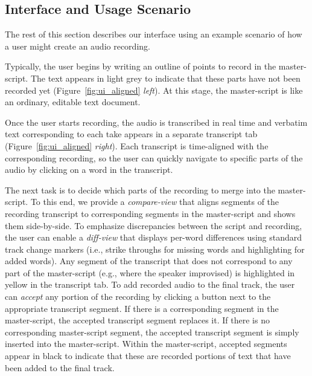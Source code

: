 
\subsection{Interface and Usage Scenario}
The rest of this section describes our interface using an example scenario of how a user might create an audio recording. 

Typically, the user begins by writing an outline of points to record in the master-script.
The text appears in light grey to indicate that these parts have not been recorded yet (Figure~\ref{fig:ui_aligned} \textit{left}). At this stage, the master-script is like an ordinary, editable text document. 

Once the user starts recording, the audio is transcribed in real time and verbatim text corresponding to each take appears in a separate transcript tab (Figure~\ref{fig:ui_aligned} \textit{right}). Each transcript is time-aligned with the corresponding recording, so the user can quickly navigate to specific
parts of the audio by clicking on a word in the transcript. 

The next task is to decide which parts of the recording to merge into the master-script. To this end, we provide a \textit{compare-view} that aligns segments of the recording transcript to corresponding segments in the master-script and shows them side-by-side. To emphasize discrepancies between the script and recording, the user can enable a \textit{diff-view} that displays per-word differences using standard track change markers (i.e., strike throughs for missing words and highlighting for added words). Any segment of the transcript that does not correspond to any part of the master-script (e.g., where the speaker improvised) is highlighted in yellow in the transcript tab. To add recorded audio to the final track, the user can \textit{accept} any portion of the recording by clicking a button next to the appropriate transcript segment. If there is a corresponding segment in the master-script, the accepted transcript segment replaces it. If there is no corresponding master-script segment, the accepted transcript segment is simply inserted into the master-script. Within the master-script, accepted segments appear in black to indicate that these are recorded portions of text that have been added to the final track. 

